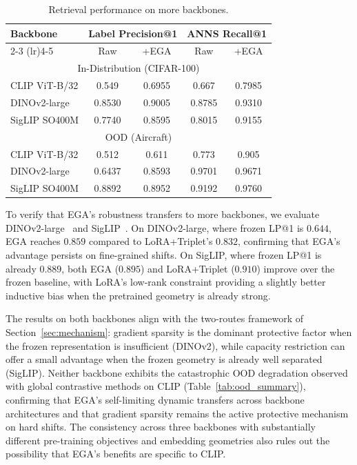 \documentclass{article}
\begin{document}
\begin{table}
		\vspace{-1em}
    \centering
    \caption{Retrieval performance on more backbones.}
    \label{tab:ega_backbones}
    \small
    \begin{tabular}{lcccc}
        \toprule
        \multirow{2}{*}{Backbone} & \multicolumn{2}{c}{Label Precision@1} & \multicolumn{2}{c}{ANNS Recall@1} \\
        \cmidrule(lr){2-3} \cmidrule(lr){4-5}
                                  & Raw     & +EGA   & Raw     & +EGA   \\
        \midrule
        \multicolumn{5}{c}{\small In-Distribution (CIFAR-100)} \\
        CLIP ViT-B/32             & 0.549   & 0.6955 & 0.667   & 0.7985 \\
        DINOv2-large              & 0.8530  & 0.9005 & 0.8785  & 0.9310 \\
        SigLIP SO400M             & 0.7740  & 0.8595 & 0.8015  & 0.9155 \\
        \midrule
        \multicolumn{5}{c}{\small OOD (Aircraft)} \\
        CLIP ViT-B/32             & 0.512   & 0.611  & 0.773   & 0.905  \\
        DINOv2-large              & 0.6437  & 0.8593 & 0.9701  & 0.9671 \\
        SigLIP SO400M             & 0.8892  & 0.8952 & 0.9192  & 0.9760 \\
        \bottomrule
    \end{tabular}
		\vspace{-1em}
\end{table}
To verify that EGA's robustness transfers to more backbones, we evaluate DINOv2-large~\cite{oquab2024dinov} and SigLIP~\cite{10377550}.
On DINOv2-large, where frozen LP@1 is $0.644$, EGA reaches $0.859$ compared to LoRA+Triplet's $0.832$, confirming that EGA's advantage persists on fine-grained shifts.
On SigLIP, where frozen LP@1 is already $0.889$, both EGA ($0.895$) and LoRA+Triplet ($0.910$) improve over the frozen baseline, with LoRA's low-rank constraint providing a slightly better inductive bias when the pretrained geometry is already strong.

The results on both backbones align with the two-routes framework of Section~\ref{sec:mechanism}: gradient sparsity is the dominant protective factor when the frozen representation is insufficient (DINOv2), while capacity restriction can offer a small advantage when the frozen geometry is already well separated (SigLIP).
Neither backbone exhibits the catastrophic OOD degradation observed with global contrastive methods on CLIP (Table~\ref{tab:ood_summary}), confirming that EGA's self-limiting dynamic transfers across backbone architectures and that gradient sparsity remains the active protective mechanism on hard shifts.
The consistency across three backbones with substantially different pre-training objectives and embedding geometries also rules out the possibility that EGA's benefits are specific to CLIP.
\end{document}
